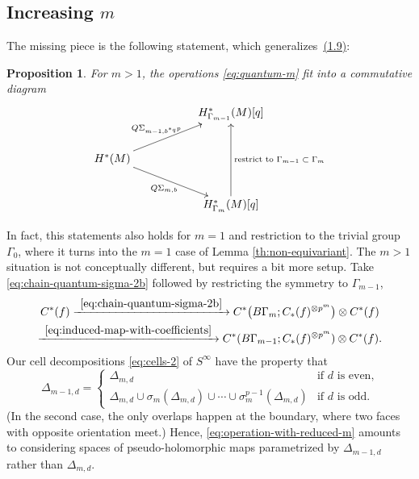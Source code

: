 \documentclass[10pt,a4paper]{amsart}
\newcommand\To[1]{\mathchoice{\xrightarrow{\textstyle\kern4pt#1\kern3pt}}{\stackrel{#1}{\longrightarrow}}{}{}}
\theoremstyle{plain}
\newtheorem{proposition}[theorem]{Proposition}
\theoremstyle{definition}
\begin{document}
\subsection{Increasing $m$}
The missing piece is the following statement, which generalizes~\href{https://jep.centre-mersenne.org/articles/10.5802/jep.324/}{(1.9)}:

\begin{proposition} \label{th:reducing-diagram}
For $m>1$, the operations \eqref{eq:quantum-m} fit into a commutative diagram
\begin{equation}\label{eq:reducing-diagram}
\xymatrix{
&&
H^*_{\Gamma_{m-1}}(M)[q]
\\
H^*(M)\ar[drr]_-{Q\Sigma_{m,b}} \ar[urr]^-{Q\Sigma_{m-1,b^{\ast_q p}}}
\\
&&
H^*_{\Gamma_{m}}(M)[q] \ar[uu]_-{\text{\rm restrict to $\Gamma_{m-1} \subset \Gamma_m$}}
}
\end{equation}
\end{proposition}

In fact, this statements also holds for $m = 1$ and restriction to the trivial group~$\Gamma_0$, where it turns into the $m = 1$ case of Lemma \ref{th:non-equivariant}. The $m>1$ situation is not conceptually different, but requires a bit more setup. Take \eqref{eq:chain-quantum-sigma-2b} followed by restricting the symmetry to $\Gamma_{m-1}$,
\begin{multline}\label{eq:operation-with-reduced-m}
C^*(f) \To{\eqref{eq:chain-quantum-sigma-2b}} C^*\bigl(B\Gamma_{m};C_*(f)^{\otimes p^{m}}\bigr) \otimes C^*(f)
\\
\To{\eqref{eq:induced-map-with-coefficients}} C^*(B\Gamma_{m-1};C_*(f)^{\otimes p^{m}}) \otimes C^*(f).
\end{multline}
Our cell decompositions \eqref{eq:cells-2} of $S^\infty$ have the property that
\begin{equation*}
\Delta_{m-1,d} = \begin{cases} \Delta_{m,d} & \text{if $d$ is even,} \\
\Delta_{m,d} \cup \sigma_{m}(\Delta_{m,d}) \cup \cdots
\cup \sigma_{m}^{p-1}(\Delta_{m,d}) & \text{if $d$ is odd.}
\end{cases}
\end{equation*}
(In the second case, the only overlaps happen at the boundary, where two faces with opposite orientation meet.) Hence, \eqref{eq:operation-with-reduced-m} amounts to considering spaces of pseudo-holomorphic maps parametrized by $\Delta_{m-1,d}$ rather than $\Delta_{m,d}$.
\end{document}
